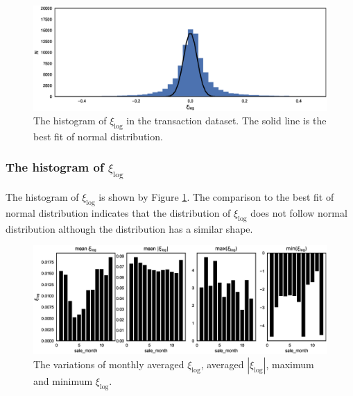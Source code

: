 \documentclass[12pt]{article}
\begin{document}
\begin{figure}[!ht]
	\centering
	\includegraphics[width=0.9\linewidth]{pic/hist-error}
	\caption{The histogram of $\xi_{\log}$ in the transaction dataset. The solid line is the best fit of normal distribution.}
	\label{fig:hist-error}
\end{figure}

\subsubsection{The histogram of $\xi_{\log}$}
The histogram of $\xi_{\log}$ is shown by Figure \ref{fig:hist-error}. The comparison to the best fit of normal distribution indicates that the distribution of $\xi_{\log}$ does not follow normal distribution although the distribution has a similar shape.  

\begin{figure}[!ht]
	\centering
	\includegraphics[width=1\linewidth]{pic/error-vs-month}
	\caption{The variations of monthly averaged $\xi_{\log}$, averaged $|\xi_{\log}|$, maximum and minimum $\xi_{\log}$.}
	\label{fig:error-vs-month}
\end{figure}
\end{document}
